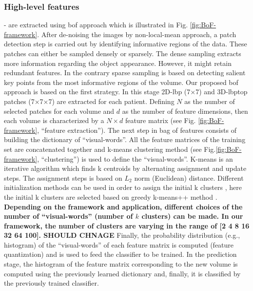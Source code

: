 \subsubsection{High-level features} - are extracted using \ac{bof} approach which is illustrated in Fig. \ref{fig:BoF-framework}. After de-noising the images by non-local-mean approach, a patch detection step is carried out by identifying informative regions of the data. These patches can either be sampled densely or sparsely. The dense sampling extracts more information regarding the object appearance. However, it might retain redundant features. In the contrary sparse sampling is based on detecting salient key points from the most informative regions of the volume. Our proposed \ac{bof} approach is based on the first strategy. In this stage 2D-\ac{lbp} (7$\times$7) and 3D-\ac{lbptop} patches (7$\times$7$\times$7) are extracted for each patient. Defining $N$ as the number of selected patches for each volume and $d$ as the number of feature dimensions, then each volume is characterized by a $N \times d$ feature matrix (see Fig. \ref{fig:BoF-framework}, ``feature extraction''). The next step in bag of features consists of building the dictionary of ``visual-words''. All the feature matrices of the training set are concatenated together and k-means clustering method (see Fig.\ref{fig:BoF-framework}, ``clustering'') is used to define the ``visual-words''. K-means is an iterative algorithm which finds k centroids by alternating assignment and update steps. The assignment steps is based on $L_{2}$ norm (Euclidean) distance. Different initialization methods can be used in order to assign the initial k clusters \cite {celebi2013comparative}, here the initial k clusters are selected based on greedy k-means++ method \cite{arthur2007k}. \textbf{Depending on the framework and application, different choices of the number of ``visual-words'' (number of $k$ clusters) can be made. In our framework, the number of clusters are varying in the range of [2 4 8 16 32 64 100]. SHOULD CHNAGE} Finally, the probability distribution (e.g., histogram) of the ``visual-words'' of each feature matrix is computed (feature quantization) and is used to feed the classifier to be trained. In the prediction stage, the histogram of the feature matrix corresponding to the new volume is computed using the previously learned dictionary and, finally, it is classified by the previously trained classifier.\\


% 

